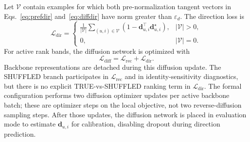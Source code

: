 \documentclass[sigconf,anonymous,review]{acmart}
\begin{document}
Let $\mathcal{V}$ contain examples for which both pre-normalization tangent vectors in Eqs.~\eqref{eq:prefdir} and~\eqref{eq:diffdir} have norm greater than $\varepsilon_d$.
The direction loss is
\begin{equation}
    \mathcal{L}_{\mathrm{dir}}
    =
    \begin{cases}
    \displaystyle
    \frac{1}{|\mathcal{V}|}
    \sum_{(u,i)\in\mathcal{V}}
    \left(1-\mathbf{d}_{u,i}^{\top}\mathbf{d}^{\star}_{u,i}\right),
    & |\mathcal{V}|>0,\\[6pt]
    0, & |\mathcal{V}|=0.
    \end{cases}
    \label{eq:dirloss}
\end{equation}
For active rank bands, the diffusion network is optimized with
\begin{equation}
    \mathcal{L}_{\mathrm{diff}}
    =
    \mathcal{L}_{\mathrm{rec}}
    +
    \mathcal{L}_{\mathrm{dir}}.
\end{equation}
Backbone representations are detached during this diffusion update.
The SHUFFLED branch participates in $\mathcal{L}_{\mathrm{rec}}$ and in identity-sensitivity diagnostics, but there is no explicit TRUE-vs-SHUFFLED ranking term in $\mathcal{L}_{\mathrm{dir}}$.
The formal configuration performs two diffusion optimizer updates per active backbone batch; these are optimizer steps on the local objective, not two reverse-diffusion sampling steps.
After those updates, the diffusion network is placed in evaluation mode to estimate $\mathbf{d}_{u,i}$ for calibration, disabling dropout during direction prediction.
\end{document}
